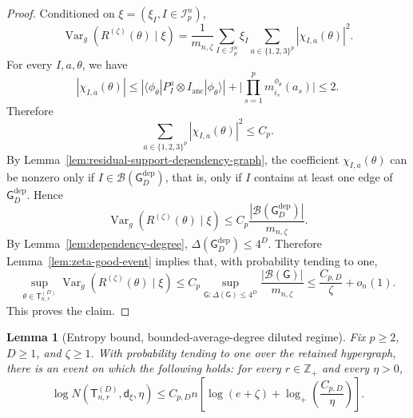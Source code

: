 \documentclass[12pt]{article}
\newtheorem{lemma}[theorem]{Lemma}
\newcommand{\mcB}{\mathcal{B}}
\newcommand{\mcI}{\mathcal{I}}
\newcommand{\tvar}{\operatorname{Var}}
\begin{document}
\begin{proof}
Conditioned on \(\xi=(\xi_I, I\in \mcI_p^n) \),
\[
\tvar_g
(R^{(\zeta)}(\theta)\mid\xi )
=
\frac1{m_{n,\zeta}}
\sum_{I\in\mcI_p^n}
\xi_I
\sum_{a\in\{1,2,3\}^p}
|\chi_{I,a}(\theta)|^2 .
\]
For every \(I,a,\theta\), we have
\[
    |\chi_{I,a}(\theta)|
    \le
    |\langle\phi_{\theta}|P_I^a \otimes I_{\mathrm{anc}}|\phi_{\theta} \rangle|
    +
    \big |\prod_{s=1}^p m^{\phi_\theta}_{i_s}(a_s)\big |
    \le 2.
\]
Therefore
\[
    \sum_{a\in\{1,2,3\}^p}
    |\chi_{I,a}(\theta)|^2
    \le
    C_p .
\]
By
Lemma~\ref{lem:residual-support-dependency-graph}, the coefficient
\(\chi_{I,a}(\theta)\) can be nonzero only if $I\in \mcB(\mathsf G_D^{\mathrm{dep}})$, that is, only if \(I\) contains at least one edge of
\(\mathsf G_D^{\mathrm{dep}}\). Hence
\[
\tvar_g
(R^{(\zeta)}(\theta)\mid\xi )
\le
C_p
\frac{
|\mcB(\mathsf G_D^{\mathrm{dep}})|
}{
m_{n,\zeta}
}.
\]
By Lemma~\ref{lem:dependency-degree}, $\Delta(\mathsf G_D^{\mathrm{dep}}) \le 4^D$. Therefore Lemma~\ref{lem:zeta-good-event} implies that, with
probability tending to one,
\[
\sup_{\theta\in\mathsf{T}_{n,r}^{(D)}}
\tvar_g
(R^{(\zeta)}(\theta)\mid\xi )
\le
C_p
\sup_{\mathsf G:\Delta(\mathsf G)\le4^D}
\frac{|\mcB(\mathsf G)|}{m_{n,\zeta}}
\le
\frac{C_{p,D}}{\zeta}
+
o_n(1).
\]
This proves the claim.
\end{proof}



\begin{lemma}[Entropy bound, bounded-average-degree diluted regime]
\label{lem:zeta-local-residual-entropy}
Fix \(p\ge2\), \(D\ge1\), and \(\zeta\ge1\). With probability tending to one
over the retained hypergraph, there is an event on which the following holds:
for every \(r\in\mathbb Z_+\) and every \(\eta>0\),
\[
\log N(\mathsf{T}_{n,r}^{(D)},\mathsf d_\xi,\eta)
\le
C_{p,D} n
\left[
    \log(e+\zeta)
    +
    \log_+\left(\frac{C_{p,D}}{\eta}\right)
\right].
\]
\end{lemma}
\end{document}
